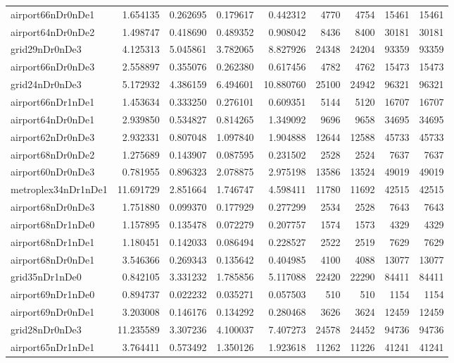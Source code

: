 \begin{longtable}{|l|r|r|r|r|r|r|r|r|}
airport66nDr0nDe1 & 1.654135 & 0.262695 & 0.179617 & 0.442312 & 4770 & 4754 & 15461 & 15461 \\
airport64nDr0nDe2 & 1.498747 & 0.418690 & 0.489352 & 0.908042 & 8436 & 8400 & 30181 & 30181 \\
grid29nDr0nDe3 & 4.125313 & 5.045861 & 3.782065 & 8.827926 & 24348 & 24204 & 93359 & 93359 \\
airport66nDr0nDe3 & 2.558897 & 0.355076 & 0.262380 & 0.617456 & 4782 & 4762 & 15473 & 15473 \\
grid24nDr0nDe3 & 5.172932 & 4.386159 & 6.494601 & 10.880760 & 25100 & 24942 & 96321 & 96321 \\
airport66nDr1nDe1 & 1.453634 & 0.333250 & 0.276101 & 0.609351 & 5144 & 5120 & 16707 & 16707 \\
airport64nDr0nDe1 & 2.939850 & 0.534827 & 0.814265 & 1.349092 & 9696 & 9658 & 34695 & 34695 \\
airport62nDr0nDe3 & 2.932331 & 0.807048 & 1.097840 & 1.904888 & 12644 & 12588 & 45733 & 45733 \\
airport68nDr0nDe2 & 1.275689 & 0.143907 & 0.087595 & 0.231502 & 2528 & 2524 & 7637 & 7637 \\
airport60nDr0nDe3 & 0.781955 & 0.896323 & 2.078875 & 2.975198 & 13586 & 13524 & 49019 & 49019 \\
metroplex34nDr1nDe1 & 11.691729 & 2.851664 & 1.746747 & 4.598411 & 11780 & 11692 & 42515 & 42515 \\
airport68nDr0nDe3 & 1.751880 & 0.099370 & 0.177929 & 0.277299 & 2534 & 2528 & 7643 & 7643 \\
airport68nDr1nDe0 & 1.157895 & 0.135478 & 0.072279 & 0.207757 & 1574 & 1573 & 4329 & 4329 \\
airport68nDr1nDe1 & 1.180451 & 0.142033 & 0.086494 & 0.228527 & 2522 & 2519 & 7629 & 7629 \\
airport68nDr0nDe1 & 3.546366 & 0.269343 & 0.135642 & 0.404985 & 4100 & 4088 & 13077 & 13077 \\
grid35nDr1nDe0 & 0.842105 & 3.331232 & 1.785856 & 5.117088 & 22420 & 22290 & 84411 & 84411 \\
airport69nDr1nDe0 & 0.894737 & 0.022232 & 0.035271 & 0.057503 & 510 & 510 & 1154 & 1154 \\
airport69nDr0nDe1 & 3.203008 & 0.146176 & 0.134292 & 0.280468 & 3626 & 3624 & 12459 & 12459 \\
grid28nDr0nDe3 & 11.235589 & 3.307236 & 4.100037 & 7.407273 & 24578 & 24452 & 94736 & 94736 \\
airport65nDr1nDe1 & 3.764411 & 0.573492 & 1.350126 & 1.923618 & 11262 & 11226 & 41241 & 41241 \\

\end{longtable}
